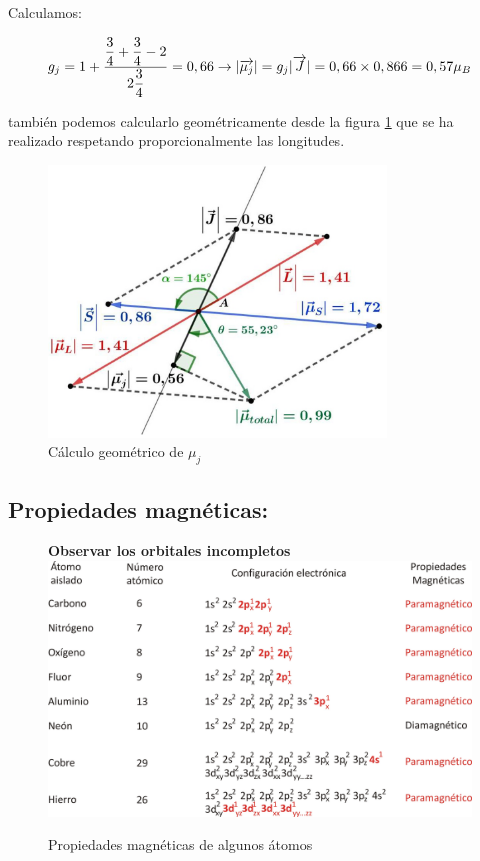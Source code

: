Calculamos:

\begin{equation*}
	g_{j}= 1 +\dfrac{\dfrac{3}{4}+\dfrac{3}{4}-2}{2\dfrac{3}{4}} = 0,66 \rightarrow \vert \overrightarrow{\mu_{j}} \vert =  g_{j}\vert \overrightarrow{J} \vert= 0,66 \times 0,866=0,57\mu_{B}
\end{equation*} 

también podemos calcularlo geométricamente desde la figura \ref{fig:s1} que se ha realizado respetando proporcionalmente las longitudes.

\begin{figure}[H]
    \centering
    \includegraphics[width=0.8\textwidth]{./Figures/fig_s1}
	\caption{Cálculo geométrico de $\mu_{j}$ }
	\label{fig:s1}
\end{figure}

\subsection{Propiedades magnéticas:}


\begin{figure}[H]
    \centering
    \textbf{Observar los orbitales incompletos}
    \vspace{1.0cm}
    \includegraphics[width=1.0\textwidth]{./Figures/PropMagneticasDeAlgunosAtomos}
	\caption{Propiedades magnéticas de algunos átomos}
	\label{fig:PropMagneticasDeAlgunosAtomos}
\end{figure}



